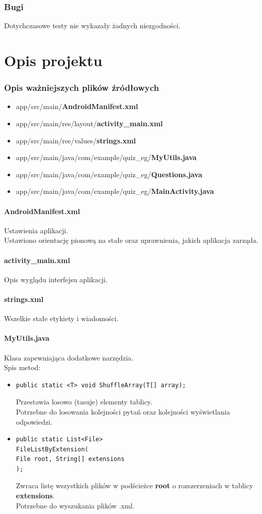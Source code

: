 \documentclass[12pt, a4paper]{article}
\begin{document}
\section{Bugi}
Dotychczasowe testy nie wykazały żadnych niezgodności.
\newpage
\part{Opis projektu}
\section{Opis ważniejszych plików źródłowych}
\begin{itemize}
\item app/src/main/\textbf{AndroidManifest.xml}
\item app/src/main/res/layout/\textbf{activity\_main.xml}
\item app/src/main/res/values/\textbf{strings.xml}
\item app/src/main/java/com/example/quiz\_eg/\textbf{MyUtils.java}
\item app/src/main/java/com/example/quiz\_eg/\textbf{Questions.java}
\item app/src/main/java/com/example/quiz\_eg/\textbf{MainActivity.java}
\end{itemize}
\subsection{AndroidManifest.xml}
Ustawienia aplikacji.\\
Ustawiono orientację pionową na stałe oraz uprawnienia, jakich aplikacja zarząda.
\subsection{activity\_main.xml}
Opis wyglądu interfejsu aplikacji.
\subsection{strings.xml}
Wszelkie stałe etykiety i wiadomości.
\subsection{MyUtils.java}
Klasa zapewniająca dodatkowe narzędzia.\\
Spis metod:\\
\begin{itemize}
\item
\begin{lstlisting}
public static <T> void ShuffleArray(T[] array);
\end{lstlisting}
Przestawia losowo (tasuje) elementy tablicy.\\
Potrzebne do losowania kolejności pytań oraz kolejności wyświetlania odpowiedzi.
\item\begin{lstlisting}
public static List<File>
FileListByExtension(
File root, String[] extensions
);
\end{lstlisting}
Zwraca listę wszystkich plików w podścieżce \textbf{root} o rozszerzeniach w tablicy \textbf{extensions}.\\
Potrzebne do wyszukania plików .xml.
\end{itemize}
\end{document}
